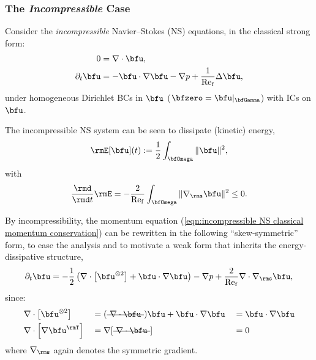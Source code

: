 \subsubsection*{The \emph{Incompressible} Case}
    Consider the \emph{incompressible} Navier--Stokes (NS) equations, in the classical strong form:
    \begin{align}
                       0  &=  \nabla\cdot\bfu,  \label{eqn:incompressible NS mass conservation}  \\
        \partial_{t}\bfu  &=  - \bfu\cdot\nabla\bfu - \nabla p + \frac{1}{\rmRef}\Delta\bfu,  \label{eqn:incompressible NS classical momentum conservation}
    \end{align}
    under homogeneous Dirichlet BCs in $\bfu$ ($\bfzero  =  \bfu|_{\bfGamma}$) with ICs on $\bfu$.
    
    \shortline

    The incompressible NS system can be seen to dissipate (kinetic) energy,
    \begin{equation}\label{eqn:incompressible NS energy definition}
        \rmE[\bfu](t)  :=  \frac{1}{2}\int_{\bfOmega}\|\bfu\|^{2},
    \end{equation}
    with
    \begin{equation}
        \frac{\rmd}{\rmd t}\rmE  =  - \frac{2}{\rmRef}\int_{\bfOmega}\|\nabla_{\rms}\bfu\|^{2}  \leq  0.
    \end{equation}

    \shortline

    By incompressibility, the momentum equation (\ref{eqn:incompressible NS classical momentum conservation}) can be rewritten in the following ``skew-symmetric'' form, to ease the analysis and to motivate a weak form that inherits the energy-dissipative structure,
    \begin{equation}\label{eqn:incompressible NS skew-symmetric momentum equation}
        \partial_{t}\bfu  =  - \frac{1}{2}\left(\nabla\cdot\left[\bfu^{\otimes 2}\right] + \bfu\cdot\nabla\bfu\right) - \nabla p + \frac{2}{\rmRef}\nabla\cdot\nabla_{\rms}\bfu,
    \end{equation}
    since:
    \begin{align}
        &\nabla\cdot\left[\bfu^{\otimes 2}\right]   &&=  (\mst{\nabla\cdot\bfu})\bfu + \bfu\cdot\nabla\bfu  &&=  \bfu\cdot\nabla\bfu  \\
        &\nabla\cdot\left[\nabla\bfu^{\rmT}\right]  &&=  \nabla[\mst{\nabla\cdot\bfu}]                      &&=  0
    \end{align}
    where $\nabla_{\rms}$ again denotes the symmetric gradient.

